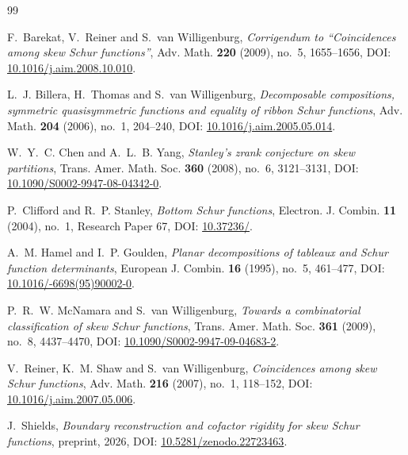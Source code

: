\documentclass[11pt,a4paper]{amsart}
\numberwithin{equation}{section}
\theoremstyle{plain}
\theoremstyle{definition}
\begin{document}
\begin{thebibliography}{99}

F.~Barekat, V.~Reiner and S.~van Willigenburg,
\emph{Corrigendum to ``Coincidences among skew Schur functions''},
Adv. Math. \textbf{220} (2009), no.~5, 1655--1656,
DOI: \href{https://doi.org/10.1016/j.aim.2008.10.010}{10.1016/\allowbreak j.aim.2008.10.010}.

L.~J. Billera, H.~Thomas and S.~van Willigenburg,
\emph{Decomposable compositions, symmetric quasisymmetric functions and equality of ribbon Schur functions},
Adv. Math. \textbf{204} (2006), no.~1, 204--240,
DOI: \href{https://doi.org/10.1016/j.aim.2005.05.014}{10.1016/\allowbreak j.aim.2005.05.014}.

W.~Y.~C. Chen and A.~L.~B. Yang,
\emph{Stanley's zrank conjecture on skew partitions},
Trans. Amer. Math. Soc. \textbf{360} (2008), no.~6, 3121--3131,
DOI: \href{https://doi.org/10.1090/S0002-9947-08-04342-0}{10.1090/\allowbreak S0002-9947-08-04342-0}.

P.~Clifford and R.~P. Stanley,
\emph{Bottom Schur functions},
Electron. J. Combin. \textbf{11} (2004), no.~1, Research Paper 67,
DOI: \href{https://doi.org/10.37236/1820}{10.37236/}.

A.~M. Hamel and I.~P. Goulden,
\emph{Planar decompositions of tableaux and Schur function determinants},
European J. Combin. \textbf{16} (1995), no.~5, 461--477,
DOI: \href{https://doi.org/10.1016/0195-6698(95)90002-0}{10.1016/-6698(95)90002-0}.

P.~R.~W. McNamara and S.~van Willigenburg,
\emph{Towards a combinatorial classification of skew Schur functions},
Trans. Amer. Math. Soc. \textbf{361} (2009), no.~8, 4437--4470,
DOI: \href{https://doi.org/10.1090/S0002-9947-09-04683-2}{10.1090/\allowbreak S0002-9947-09-04683-2}.

V.~Reiner, K.~M. Shaw and S.~van Willigenburg,
\emph{Coincidences among skew Schur functions},
Adv. Math. \textbf{216} (2007), no.~1, 118--152,
DOI: \href{https://doi.org/10.1016/j.aim.2007.05.006}{10.1016/\allowbreak j.aim.2007.05.006}.

J.~Shields,
\emph{Boundary reconstruction and cofactor rigidity for skew Schur functions},
preprint, 2026,
DOI: \href{https://doi.org/10.5281/zenodo.22723463}{10.5281/\allowbreak zenodo.22723463}.


\end{thebibliography}
\end{document}
